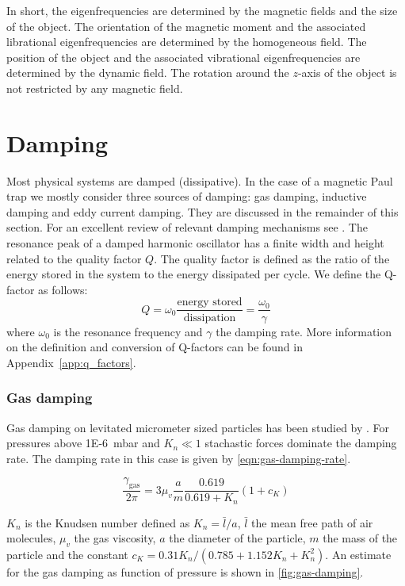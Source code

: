 In short, the eigenfrequencies are determined by the magnetic fields and the size of the object. The orientation of the magnetic moment and the associated librational eigenfrequencies are determined by the homogeneous field. The position of the object and the associated vibrational eigenfrequencies are determined by the dynamic field. The rotation around the $z$-axis of the object is not restricted by any magnetic field.

\section{Damping}
\label{sec:damping}
Most physical systems are damped (dissipative). In the case of a magnetic Paul trap we mostly consider three sources of damping: gas damping, inductive damping and eddy current damping. They are discussed in the remainder of this section. For an excellent review of relevant damping mechanisms see \textcite{millen}. The resonance peak of a damped harmonic oscillator has a finite width and height related to the quality factor $Q$. The quality factor is defined as the ratio of the energy stored in the system to the energy dissipated per cycle. We define the Q-factor as follows:
\begin{equation*}
    Q = \omega_0 \frac{\text{energy stored}}{\text{dissipation}} = \frac{\omega_0}{\gamma}
\end{equation*}
where $\omega_0$ is the resonance frequency and $\gamma$ the damping rate. More information on the definition and conversion of Q-factors can be found in Appendix~\ref{app:q_factors}.

\subsubsection{Gas damping}
\label{subsubsec:gas-damping}
Gas damping on levitated micrometer sized particles has been studied by \textcite{millen}. For pressures above \qty{1E-6}{\milli\bar} and $K_n \ll 1$ stachastic forces dominate the damping rate. The damping rate in this case is given by \autoref{eqn:gas-damping-rate}.

\begin{equation}
    \frac{\gamma_{\text {gas}}}{2 \pi}=3 \mu_v \frac{a}{m} \frac{0.619}{0.619+K_n} \left( 1+c_K \right)
    \label{eqn:gas-damping-rate}
\end{equation}

$K_n$ is the Knudsen number defined as $K_n = \bar{l}/a$, $\bar{l}$ the mean free path of air molecules, $\mu_v$ the gas viscosity, $a$ the diameter of the particle, $m$ the mass of the particle and the constant $c_K = 0.31 K_n / \left(0.785 + 1.152 K_n + K_n^2 \right)$. An estimate for the gas damping as function of pressure is shown in \autoref{fig:gas-damping}.

